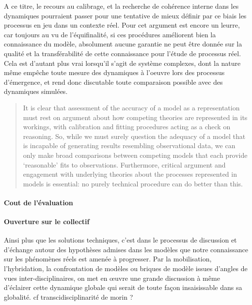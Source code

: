 A ce titre, le recours au calibrage, et la recherche de cohérence interne dans les dynamiques pourraient passer pour une tentative de mieux définir par ce biais les processus en jeu dans un contexte réel. Pour \autocite{OSullivan2004} cet argument est encore un leurre, car toujours au vu de l'équifinalité, si ces procédures améliorent bien la connaissance du modèle, absolument aucune garantie ne peut être donnée sur la qualité et la transférabilité de cette connaissance pour l'étude de processus réel. Cela est d'autant plus vrai lorsqu'il s'agit de système complexes, dont la nature même empêche toute  mesure des dynamiques à l'oeuvre lors des processus d'émergence, et rend donc discutable toute comparaison possible avec des dynamiques simulées.

\begin{quotation} It is clear that assessment of the accuracy of a model as a representation must rest on argument about how competing theories are represented in its workings, with calibration and fitting procedures acting as a check on reasoning. So, while we must surely question the adequacy of a model that is incapable of generating results resembling observational data, we can only make broad comparisons between competing models that each provide ‘reasonable’ fits to observations. Furthermore, critical argument and engagement with underlying theories about the processes represented in models is essential: no purely technical procedure can do better than this.  \\  \end{quotation}



\paragraph{Cout de l'évaluation}


\paragraph{Ouverture sur le collectif}

Ainsi plus que les solutions techniques, c'est dans le processus de discussion et d'échange autour des hypothèses admises dans les modèles que notre connaissance sur les phénomènes réels est amenée à progresser. Par la mobilisation, l'hybridation, la confrontation de modèles ou briques de modèle issues d'angles de vues inter-disciplinaires,  on met en œuvre une grande discussion à même d'éclairer cette dynamique globale qui serait de toute façon insaisissable dans sa globalité. {cf transcidisciplinarité de morin ?}

